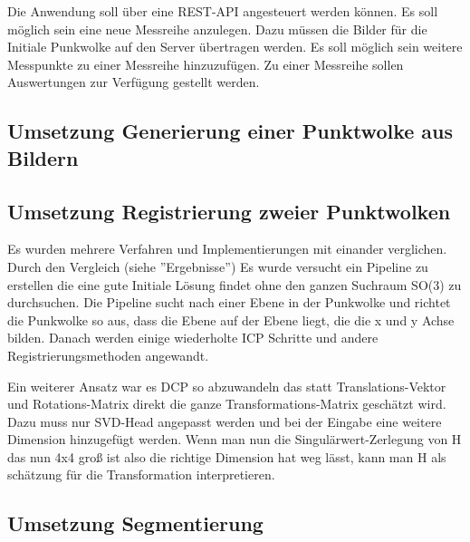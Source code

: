 \documentclass[12pt,titlepage,twoside]{article}
\begin{document}
Die Anwendung soll über eine REST-API angesteuert werden können. Es soll möglich sein eine neue Messreihe anzulegen. Dazu müssen die Bilder für die Initiale Punkwolke auf den Server übertragen werden. 
Es soll möglich sein weitere Messpunkte zu einer Messreihe hinzuzufügen. Zu einer Messreihe sollen Auswertungen zur Verfügung gestellt werden. 

\subsection{Umsetzung Generierung einer Punktwolke aus Bildern}
\label{sec:realisierung:implementierung1}

\subsection{Umsetzung Registrierung zweier Punktwolken}
\label{sec:realisierung:implementierung2}

Es wurden mehrere Verfahren und Implementierungen mit einander verglichen. Durch den Vergleich (siehe ''Ergebnisse'') Es wurde versucht ein Pipeline zu erstellen die eine gute Initiale Lösung findet ohne den ganzen Suchraum SO(3) zu durchsuchen.
Die Pipeline sucht nach einer Ebene in der Punkwolke und richtet die Punkwolke so aus, dass die Ebene auf der Ebene liegt, die die x und y Achse bilden. Danach werden einige wiederholte ICP Schritte und andere Registrierungsmethoden angewandt.

Ein weiterer Ansatz war es DCP so abzuwandeln das statt Translations-Vektor und Rotations-Matrix direkt die ganze Transformations-Matrix geschätzt wird. Dazu muss nur SVD-Head angepasst werden 
und bei der Eingabe eine weitere Dimension hinzugefügt werden. Wenn man nun die Singulärwert-Zerlegung von H das nun 4x4 groß ist also die richtige Dimension hat weg lässt, kann man H als schätzung für die Transformation interpretieren.


\subsection{Umsetzung Segmentierung}
\label{sec:realisierung:implementierung2}
\end{document}
